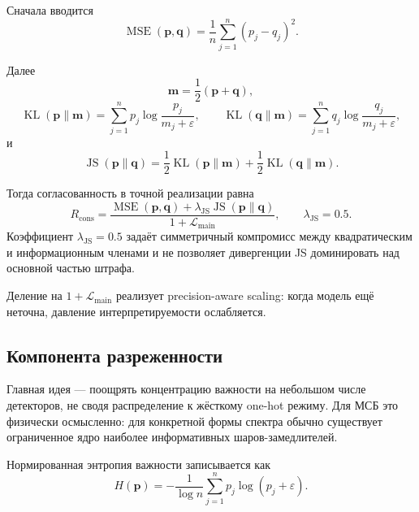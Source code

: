 \documentclass[11pt]{article}
\begin{document}
Сначала вводится
\begin{equation}
\operatorname{MSE}(\mathbf{p},\mathbf{q}) = \frac{1}{n} \sum_{j=1}^{n} (p_j - q_j)^2.
\end{equation}

Далее
\begin{equation}
\mathbf{m} = \frac{1}{2}(\mathbf{p}+\mathbf{q}),
\end{equation}
\begin{equation}
\operatorname{KL}(\mathbf{p}\|\mathbf{m}) = \sum_{j=1}^{n} p_j \log \frac{p_j}{m_j + \varepsilon},
\qquad
\operatorname{KL}(\mathbf{q}\|\mathbf{m}) = \sum_{j=1}^{n} q_j \log \frac{q_j}{m_j + \varepsilon},
\end{equation}
и
\begin{equation}
\operatorname{JS}(\mathbf{p}\|\mathbf{q}) = \frac{1}{2}\operatorname{KL}(\mathbf{p}\|\mathbf{m}) + \frac{1}{2}\operatorname{KL}(\mathbf{q}\|\mathbf{m}).
\end{equation}

Тогда согласованность в точной реализации равна
\begin{equation}
R_{\mathrm{cons}} = \frac{\operatorname{MSE}(\mathbf{p},\mathbf{q}) + \lambda_{\mathrm{JS}}\operatorname{JS}(\mathbf{p}\|\mathbf{q})}{1 + \mathcal{L}_{\mathrm{main}}},
\qquad
\lambda_{\mathrm{JS}} = 0.5.
\end{equation}
Коэффициент $\lambda_{\mathrm{JS}}=0.5$ задаёт симметричный компромисс между квадратическим и информационным членами и не позволяет дивергенции JS доминировать над основной частью штрафа.

Деление на $1+\mathcal{L}_{\mathrm{main}}$ реализует precision-aware scaling: когда модель ещё неточна, давление интерпретируемости ослабляется.

\subsection{Компонента разреженности}

Главная идея --- поощрять концентрацию важности на небольшом числе детекторов, не сводя распределение к жёсткому one-hot режиму. Для МСБ это физически осмысленно: для конкретной формы спектра обычно существует ограниченное ядро наиболее информативных шаров-замедлителей.

Нормированная энтропия важности записывается как
\begin{equation}
H(\mathbf{p}) = -\frac{1}{\log n} \sum_{j=1}^{n} p_j \log(p_j + \varepsilon).
\end{equation}
\end{document}
